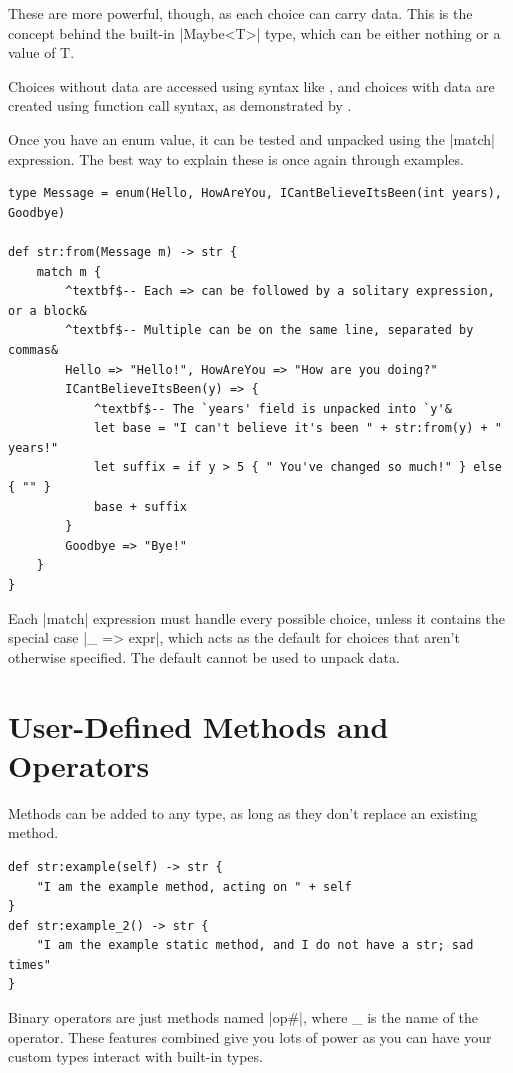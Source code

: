 \documentclass[11pt]{report}
\begin{document}
These are more powerful, though, as each choice can carry data. This is the concept behind the built-in |Maybe<T>| type, which can be either nothing or a value of T.

Choices without data are accessed using syntax like , and choices with data are created using function call syntax, as demonstrated by .

Once you have an enum value, it can be tested and unpacked using the |match| expression. The best way to explain these is once again through examples.

\begin{Verbatim}[commandchars=^$&]
type Message = enum(Hello, HowAreYou, ICantBelieveItsBeen(int years), Goodbye)

def str:from(Message m) -> str {
    match m {
        ^textbf$-- Each => can be followed by a solitary expression, or a block&
        ^textbf$-- Multiple can be on the same line, separated by commas&
        Hello => "Hello!", HowAreYou => "How are you doing?"
        ICantBelieveItsBeen(y) => {
            ^textbf$-- The `years' field is unpacked into `y'&
            let base = "I can't believe it's been " + str:from(y) + " years!"
            let suffix = if y > 5 { " You've changed so much!" } else { "" }
            base + suffix
        }
        Goodbye => "Bye!"
    }
}
\end{Verbatim}

Each |match| expression must handle every possible choice, unless it contains the special case |_ => expr|, which acts as the default for choices that aren't otherwise specified. The default cannot be used to unpack data.

\section{User-Defined Methods and Operators}

Methods can be added to any type, as long as they don't replace an existing method.

\begin{Verbatim}
def str:example(self) -> str {
    "I am the example method, acting on " + self
}
def str:example_2() -> str {
    "I am the example static method, and I do not have a str; sad times"
}
\end{Verbatim}

Binary operators are just methods named |op#|, where \_ is the name of the operator. These features combined give you lots of power as you can have your custom types interact with built-in types.
\end{document}

